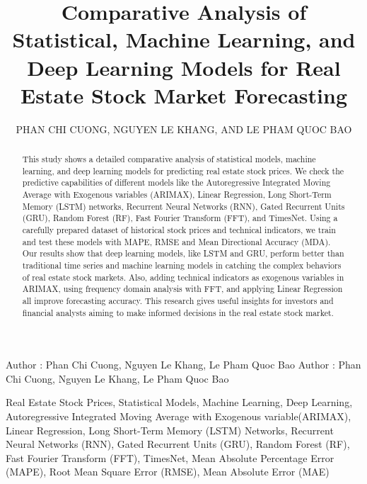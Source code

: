\documentclass{ieeeojies}
\begin{document}
\title{Comparative Analysis of Statistical, Machine Learning, and Deep Learning Models for Real Estate Stock Market Forecasting}

\author{\uppercase{Phan Chi Cuong},
\uppercase{Nguyen Le Khang, and Le Pham Quoc Bao}}

\address[1]{Faculty of Information Systems, University of Information Technology, (e-mail: 21520673@gm.uit.edu.vn)}
\address[2]{Faculty of Information Systems, University of Information Technology, (e-mail: 21520960@gm.uit.edu.vn)}
\address[3]{Faculty of Information Systems, University of Information Technology, (e-mail: 21521849@gm.uit.edu.vn)}

\markboth
{Author \headeretal: Phan Chi Cuong, Nguyen Le Khang, Le Pham Quoc Bao}
{Author \headeretal: Phan Chi Cuong, Nguyen Le Khang, Le Pham Quoc Bao}

\begin{abstract}
  This study shows a detailed comparative analysis of statistical models, machine learning, and deep learning models for predicting real estate stock prices. We check the predictive capabilities of different models like the Autoregressive Integrated Moving Average with Exogenous variables (ARIMAX), Linear Regression, Long Short-Term Memory (LSTM) networks, Recurrent Neural Networks (RNN), Gated Recurrent Units (GRU), Random Forest (RF), Fast Fourier Transform (FFT), and TimesNet. Using a carefully prepared dataset of historical stock prices and technical indicators, we train and test these models with MAPE, RMSE and Mean Directional Accuracy (MDA). Our results show that deep learning models, like LSTM and GRU, perform better than traditional time series and machine learning models in catching the complex behaviors of real estate stock markets. Also, adding technical indicators as exogenous variables in ARIMAX, using frequency domain analysis with FFT, and applying Linear Regression all improve forecasting accuracy. This research gives useful insights for investors and financial analysts aiming to make informed decisions in the real estate stock market.
\end{abstract}

\begin{keywords}
  Real Estate Stock Prices, Statistical Models, Machine Learning, Deep Learning, Autoregressive Integrated Moving Average with Exogenous variable(ARIMAX), Linear Regression, Long Short-Term Memory (LSTM) Networks, Recurrent Neural Networks (RNN), Gated Recurrent Units (GRU), Random Forest (RF), Fast Fourier Transform (FFT), TimesNet, Mean Absolute Percentage Error (MAPE), Root Mean Square Error (RMSE), Mean Absolute Error (MAE)\end{keywords}
\end{document}
